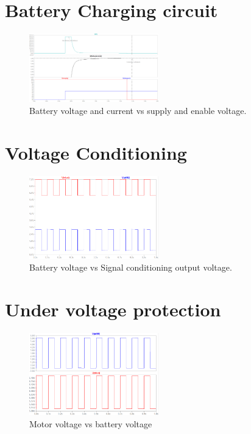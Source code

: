 \clearpage
\section{Battery Charging circuit}
\begin{figure}[H]
\centering
\includegraphics[width = 0.5\textwidth]{./Figures/Bat_Charg_Sim.png}
\caption{Battery voltage and current vs supply and enable voltage.}
\label{fig:bat_charg_sim}
\end{figure}

\clearpage
\section{Voltage Conditioning}
\begin{figure}[H]
\centering
\includegraphics[width = 0.5\textwidth]{./Figures/Volt_Cond_Sim.png}
\caption{Battery voltage vs Signal conditioning output voltage.}
\label{fig:volt_cond_sim}
\end{figure}

\clearpage
\section{Under voltage protection}
\begin{figure}[H]
\centering
\includegraphics[width = 0.5\textwidth]{./Figures/Und_volt_Sim.png}
\caption{Motor voltage vs battery voltage}
\label{fig:und_volt_sim}
\end{figure}

